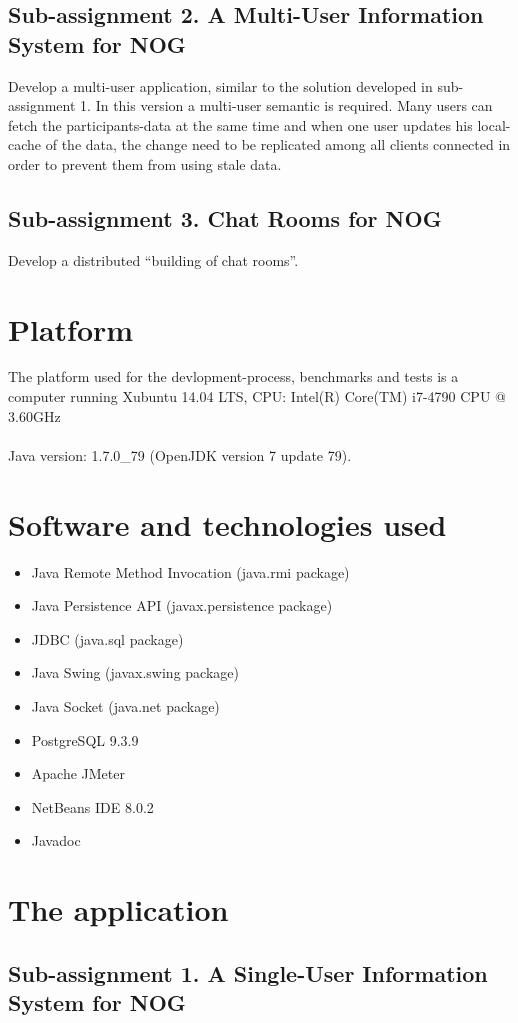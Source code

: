 \documentclass[a4paper, 11pt]{article}
\begin{document}
\subsection{Sub-assignment 2. A Multi-User Information System for NOG}
Develop a multi-user application, similar to the solution developed in sub-assignment 1. In this version a multi-user semantic is required. Many users can fetch the participants-data at the same time and when one user updates his local-cache of the data, the change need to be replicated among all clients connected in order to prevent them from using stale data.
\subsection{Sub-assignment 3. Chat Rooms for NOG}
Develop a distributed ``building of chat rooms''.

\newpage
\section{Platform}
The platform used for the devlopment-process, benchmarks and tests is a computer running Xubuntu 14.04 LTS, CPU: Intel(R) Core(TM) i7-4790 CPU @ 3.60GHz \\ \\
Java version: 1.7.0\_79  (OpenJDK version 7 update 79).
\section{Software and technologies used}
\begin{itemize}
\item Java Remote Method Invocation (java.rmi package)
\item Java Persistence API (javax.persistence package)
\item JDBC (java.sql package)
\item Java Swing (javax.swing package)
\item Java Socket (java.net package)
\item PostgreSQL 9.3.9
\item Apache JMeter
\item NetBeans IDE 8.0.2
\item Javadoc
\end{itemize}
\newpage
\section{The application}
\subsection{Sub-assignment 1. A Single-User Information System for NOG}
\end{document}
